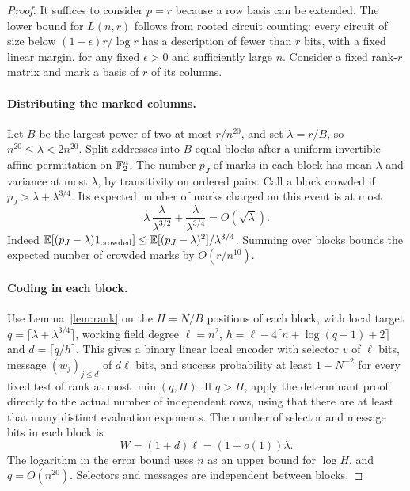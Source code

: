 \begin{proof}
It suffices to consider $p=r$ because a row basis can be extended. The lower bound for $L(n,r)$ follows from rooted circuit counting: every circuit of size below $(1-\epsilon)r/\log r$ has a description of fewer than $r$ bits, with a fixed linear margin, for any fixed $\epsilon>0$ and sufficiently large $n$. Consider a fixed rank-$r$ matrix and mark a basis of $r$ of its columns.

\paragraph{Distributing the marked columns.}
Let $B$ be the largest power of two at most $r/n^{20}$, and set $\lambda=r/B$, so $n^{20}\le\lambda<2n^{20}$. Split addresses into $B$ equal blocks after a uniform invertible affine permutation on $\mathbb F_2^n$. The number $p_J$ of marks in each block has mean $\lambda$ and variance at most $\lambda$, by transitivity on ordered pairs. Call a block crowded if $p_J>\lambda+\lambda^{3/4}$. Its expected number of marks charged on this event is at most
\[
 \lambda\,\frac{\lambda}{\lambda^{3/2}}
       +\frac{\lambda}{\lambda^{3/4}}=O(\sqrt\lambda).
\]
Indeed $\mathbb E[(p_J-\lambda)1_{\rm crowded}]\le
\mathbb E[(p_J-\lambda)^2]/\lambda^{3/4}$. Summing over blocks bounds the expected number of crowded marks by $O(r/n^{10})$.

\paragraph{Coding in each block.}
Use Lemma~\ref{lem:rank} on the $H=N/B$ positions of each block, with local target $q=\lceil\lambda+\lambda^{3/4}\rceil$, working field degree $\ell=n^2$, $h=\ell-4\lceil n+\log(q+1)+2\rceil$ and $d=\lceil q/h\rceil$. This gives a binary linear local encoder with selector $v$ of $\ell$ bits, message $(w_j)_{j\le d}$ of $d\ell$ bits, and success probability at least $1-N^{-2}$ for every fixed test of rank at most $\min(q,H)$. If $q>H$, apply the determinant proof directly to the actual number of independent rows, using that there are at least that many distinct evaluation exponents. The number of selector and message bits in each block is
\[
                   W=(1+d)\ell=(1+o(1))\lambda .
\]
The logarithm in the error bound uses $n$ as an upper bound for $\log H$, and $q=O(n^{20})$. Selectors and messages are independent between blocks.


\end{proof}
